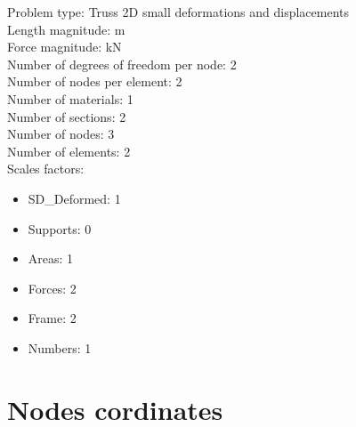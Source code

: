 \documentclass[a4paper,11pt]{article}
\begin{document}
Problem type: Truss 2D small deformations and displacements\\ 

Length magnitude: m \\

Force magnitude: kN \\

Number of degrees of freedom per node: 2 \\

Number of nodes per element: 2 \\

Number of materials: 1 \\

Number of sections: 2 \\

Number of nodes: 3 \\

Number of elements: 2 \\

Scales factors: 
\begin{itemize} 
\item  SD\_Deformed: 1 
\item  Supports: 0 
\item  Areas: 1 
\item  Forces: 2 
\item  Frame: 2 
\item  Numbers: 1 
\end{itemize} 
\newpage       

\section{Nodes cordinates} 
\end{document}
